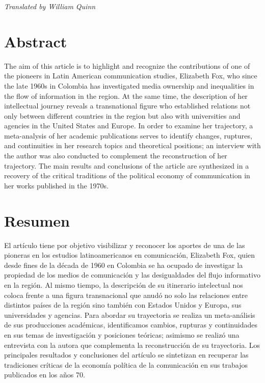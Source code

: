 \documentclass{tufte-handout}
\begin{document}
\begin{titlepage}
\begin{fullwidth}
\end{fullwidth}

\vspace*{0.5em}

\noindent\emph{Translated by William Quinn}


\hypertarget{abstract}{%
\section{Abstract}\label{abstract}}

The aim of this article is to highlight and recognize the contributions
of one of the pioneers in Latin American communication studies,
Elizabeth Fox, who since the late 1960s in Colombia has investigated
media ownership and inequalities in the flow of information in the
region. At the same time, the description of her intellectual journey
reveals a transnational figure who established relations not only
between different countries in the region but also with universities and
agencies in the United States and Europe. In order to examine her
trajectory, a meta-analysis of her academic publications serves to
identify changes, ruptures, and continuities in her research topics and
theoretical positions; an interview with the author was also conducted
to complement the reconstruction of her trajectory. The main results and
conclusions of the article are synthesized in a recovery of the critical
traditions of the political economy of communication in her works
published in the 1970s.

\hypertarget{resumen}{%
\section{Resumen}\label{resumen}}


El artículo tiene por objetivo visibilizar y reconocer los aportes de una de las pioneras en los estudios latinoamericanos en comunicación, Elizabeth Fox, quien desde fines de la década de 1960 en Colombia se ha ocupado de investigar la propiedad de los medios de comunicación y las desigualdades del flujo informativo en la región. Al mismo tiempo, la descripción de su itinerario intelectual nos coloca frente a una figura transnacional que anudó no solo las relaciones entre distintos países de la región sino también con Estados Unidos y Europa, sus universidades y agencias. Para abordar su trayectoria se realiza un meta-análisis de sus producciones académicas, identificamos cambios, rupturas y continuidades en sus temas de investigación y posiciones teóricas; asimismo se realizó una entrevista con la autora que complementa la reconstrucción de su trayectoria. Los principales resultados y conclusiones del artículo se sintetizan en recuperar las tradiciones críticas de la economía política de la comunicación en sus trabajos publicados en los años 70.




 \end{titlepage}
\end{document}
